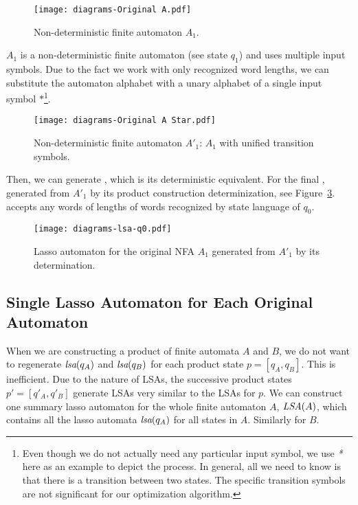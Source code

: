 \begin{figure}[ht]
	\centering
	\texttt{[image: diagrams-Original A.pdf]}
	\caption{Non-deterministic finite automaton $A_1$.}
	\label{fig:NFA_A1_orig}
\end{figure}

$A_1$ is a non-deterministic finite automaton (see state $q_1$) and uses multiple input symbols. Due to the fact we work with only recognized word lengths, we can substitute the automaton alphabet with a unary alphabet of a single input symbol $*$\footnote{Even though we do not actually need any particular input symbol, we use \emph{*} here as an example to depict the process. In general, all we need to know is that there is a transition between two states. The specific transition symbols are not significant for our optimization algorithm.}.

\begin{figure}[ht]
	\centering
	\texttt{[image: diagrams-Original A Star.pdf]}
	\caption{Non-deterministic finite automaton $A'_1$: $A_1$ with unified transition symbols.}
	\label{fig:NFA_A1_star}
\end{figure}

Then, we can generate , which is its deterministic equivalent. For the final , generated from $A'_1$ by its product construction determinization, see Figure~\ref{fig:HaL_A1}.  accepts any words of lengths of words recognized by state language of $q_0$.

\begin{figure}[ht]
	\centering
	\texttt{[image: diagrams-lsa-q0.pdf]}
	\caption{Lasso automaton  for the original NFA $A_1$ generated from $A'_1$ by its determination.}
	\label{fig:HaL_A1}
\end{figure}

\subsection{Single Lasso Automaton for Each Original Automaton}\label{sec:singleHaL}

When we are constructing a product of finite automata $A$ and $B$, we do not want to regenerate $\emph{lsa}(q_A)$ and $\emph{lsa}(q_B)$ for each product state $p = [q_A, q_B]$. This is inefficient. Due to the nature of LSAs, the successive product states $p' = [q'_A, q'_B]$ generate LSAs very similar to the LSAs for $p$. We can construct one summary lasso automaton for the whole finite automaton $A$, $\emph{LSA}(A)$, which contains all the lasso automata $\emph{lsa}(q_A)$ for all states in $A$. Similarly for $B$.

